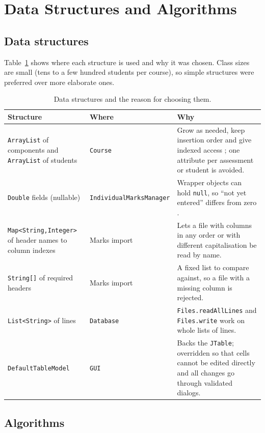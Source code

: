 \section{Data Structures and Algorithms}\label{sec:algos}

\subsection{Data structures}
Table~\ref{tab:ds} shows where each structure is used and why it was chosen. Class sizes are small (tens to a few hundred students per course), so simple structures were preferred over more elaborate ones.

\begin{table}[htbp]
\centering
\small
\renewcommand{\arraystretch}{1.1}
\caption{Data structures and the reason for choosing them.}
\label{tab:ds}
\begin{tabularx}{\textwidth}{@{}>{\raggedright\arraybackslash}p{4.2cm} >{\raggedright\arraybackslash}p{3.3cm} X@{}}
\toprule
\textbf{Structure} & \textbf{Where} & \textbf{Why}\\
\midrule
\texttt{ArrayList} of components and \texttt{ArrayList} of students & \texttt{Course} & Grow as needed, keep insertion order and give indexed access \cite{oracleArrayList}; one attribute per assessment or student is avoided.\\
\texttt{Double} fields (nullable) & \texttt{Individual\allowbreak MarksManager} & Wrapper objects can hold \texttt{null}, so ``not yet entered'' differs from zero \cite{oracleDouble}.\\
\texttt{Map<String,Integer>} of header names to column indexes & Marks import & Lets a file with columns in any order or with different capitalisation be read by name.\\
\texttt{String[]} of required headers & Marks import & A fixed list to compare against, so a file with a missing column is rejected.\\
\texttt{List<String>} of lines & \texttt{Database} & \texttt{Files.readAllLines} and \texttt{Files.write} work on whole lists of lines.\\
\texttt{DefaultTableModel} & \texttt{GUI} & Backs the \texttt{JTable}; overridden so that cells cannot be edited directly and all changes go through validated dialogs.\\
\bottomrule
\end{tabularx}
\end{table}

\subsection{Algorithms}

